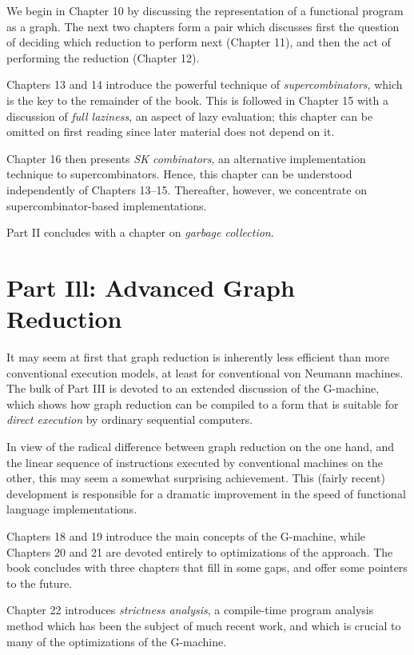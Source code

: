 We begin in Chapter 10 by discussing the representation of a functional
program as a graph. The next two chapters form a pair which discusses first the
question of deciding which reduction to perform next (Chapter 11), and then
the act of performing the reduction (Chapter 12).

Chapters 13 and 14 introduce the powerful technique of \textit{supercombinators},
which is the key to the remainder of the book. This is followed in Chapter 15
with a discussion of \textit{full laziness}, an aspect of lazy evaluation; this chapter can
be omitted on first reading since later material does not depend on it.

Chapter 16 then presents \textit{SK combinators}, an alternative implementation
technique to supercombinators. Hence, this chapter can be understood
independently of Chapters 13--15. Thereafter, however, we concentrate on
supercombinator-based implementations.

Part II concludes with a chapter on \textit{garbage collection}.

\section{Part Ill: Advanced Graph Reduction}

It may seem at first that graph reduction is inherently less efficient than more
conventional execution models, at least for conventional von Neumann
machines. The bulk of Part III is devoted to an extended discussion of the
G-machine, which shows how graph reduction can be compiled to a form that
is suitable for \textit{direct execution} by ordinary sequential computers.

In view of the radical difference between graph reduction on the one hand,
and the linear sequence of instructions executed by conventional machines on
the other, this may seem a somewhat surprising achievement. This (fairly
recent) development is responsible for a dramatic improvement in the speed
of functional language implementations.

Chapters 18 and 19 introduce the main concepts of the G-machine, while
Chapters 20 and 21 are devoted entirely to optimizations of the approach.
The book concludes with three chapters that fill in some gaps, and offer
some pointers to the future.

Chapter 22 introduces \textit{strictness analysis}, a compile-time program analysis
method which has been the subject of much recent work, and which is crucial
to many of the optimizations of the G-machine.

